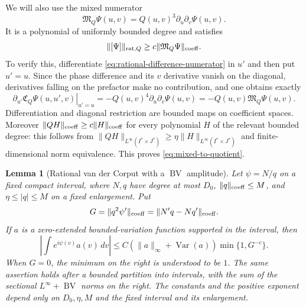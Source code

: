 \documentclass[11pt]{article}
\numberwithin{equation}{section}
\newtheorem{lemma}[theorem]{Lemma}
\theoremstyle{remark}
\theoremstyle{definition}
\newcommand{\Var}{\operatorname{Var}}
\newcommand{\norm}[1]{\lVert #1\rVert}
\newcommand{\BV}{\operatorname{BV}}
\begin{document}
We will also use the mixed numerator
\begin{equation}\label{eq:rational-mixed-numerator}
 \mathfrak M_Q\Psi(u,v)=Q(u,v)^3\partial_u\partial_v\Psi(u,v).
\end{equation}
It is a polynomial of uniformly bounded degree and satisfies
\begin{equation}\label{eq:mixed-to-quotient}
 \norm{[\Psi]}_{{\rm rat},Q}
 \ge c\norm{\mathfrak M_Q\Psi}_{\rm coeff}.
\end{equation}
To verify this, differentiate \eqref{eq:rational-difference-numerator} in
$u'$ and then put $u'=u$.  Since the phase difference and its $v$
derivative vanish on the diagonal, derivatives falling on the prefactor
make no contribution, and one obtains exactly
\[
 \left.\partial_{u'}\mathfrak C_Q\Psi(u,u',v)\right|_{u'=u}
 =-Q(u,v)^4\partial_u\partial_v\Psi(u,v)
 =-Q(u,v)\mathfrak M_Q\Psi(u,v).
\]
Differentiation and diagonal restriction are bounded maps on coefficient
spaces.  Moreover
$\norm{QH}_{\rm coeff}\ge c\norm H_{\rm coeff}$ for every polynomial $H$
of the relevant bounded degree: this follows from
$\norm{QH}_{L^\infty(I^*\times J^*)}\ge
\eta\norm H_{L^\infty(I^*\times J^*)}$ and finite-dimensional norm
equivalence.  This proves \eqref{eq:mixed-to-quotient}.

\begin{lemma}[Rational van der Corput with a $\BV$ amplitude]
\label{lem:rational-vdc}
Let $\psi=N/q$ on a fixed compact interval, where $N,q$ have degree at
most $D_0$, $\norm q_{\rm coeff}\le M$, and
$\eta\le|q|\le M$ on a fixed enlargement.  Put
\[
 G=\norm{q^2\psi'}_{\rm coeff}
   =\norm{N'q-Nq'}_{\rm coeff}.
\]
If $a$ is a zero-extended bounded-variation function supported in the
interval, then
\begin{equation}\label{eq:rational-vdc}
 \left|\int e^{i\psi(v)}a(v)\,dv\right|
 \le C(\norm a_\infty+\Var(a))\min\{1,G^{-c}\}.
\end{equation}
When \(G=0\), the minimum on the right is understood to be \(1\).
The same assertion holds after a bounded partition into intervals, with
the sum of the sectional $L^\infty+\BV$ norms on the right.
The constants and the positive exponent depend only on
$D_0,\eta,M$ and the fixed interval and its enlargement.
\end{lemma}
\end{document}
